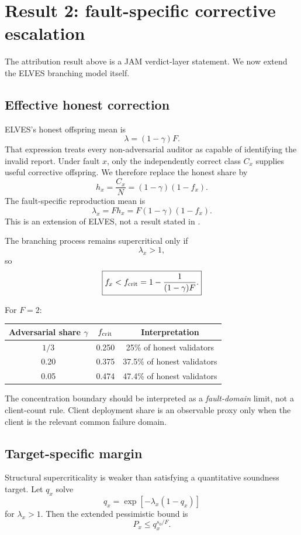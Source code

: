 \section{Result 2: fault-specific corrective escalation}
\label{sec:escalation}

The attribution result above is a JAM verdict-layer statement. We now extend the ELVES branching model itself.

\subsection{Effective honest correction}

ELVES's honest offspring mean is
\[
\lambda=(1-\gamma)F.
\]
That expression treats every non-adversarial auditor as capable of identifying the invalid report. Under fault \(x\), only the independently correct class \(C_x\) supplies useful corrective offspring. We therefore replace the honest share by
\[
h_x=\frac{C_x}{N}=(1-\gamma)(1-f_x).
\]
The fault-specific reproduction mean is
\[
\boxed{
\lambda_x=Fh_x=F(1-\gamma)(1-f_x).
}
\]
This is an extension of ELVES, not a result stated in \citet{burdges2024}.

The branching process remains supercritical only if
\[
\lambda_x>1,
\]
so
\[
\boxed{
 f_x< f_{\rm crit}
 =1-\frac{1}{(1-\gamma)F}.
}
\]

For \(F=2\):
\begin{center}
\begin{tabular}{ccc}
\toprule
Adversarial share \(\gamma\) & \(f_{\rm crit}\) & Interpretation \\
\midrule
\(1/3\) & 0.250 & 25\% of honest validators \\
0.20 & 0.375 & 37.5\% of honest validators \\
0.05 & 0.474 & 47.4\% of honest validators \\
\bottomrule
\end{tabular}
\end{center}

The concentration boundary should be interpreted as a \emph{fault-domain} limit, not a client-count rule. Client deployment share is an observable proxy only when the client is the relevant common failure domain.

\subsection{Target-specific margin}

Structural supercriticality is weaker than satisfying a quantitative soundness target. Let \(q_x\) solve
\[
q_x=\exp[-\lambda_x(1-q_x)]
\]
for \(\lambda_x>1\). Then the extended pessimistic bound is
\[
P_x\le q_x^{s_0/F}.
\]

